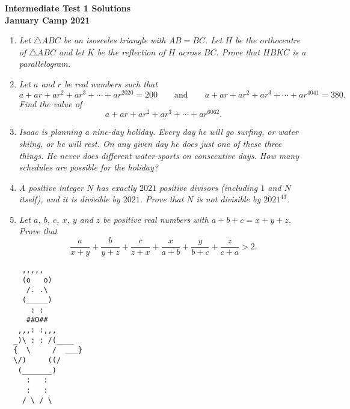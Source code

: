 \documentclass{article}
\begin{document}
\thispagestyle{empty}

\begin{center}
  \textbf{\Large Intermediate Test 1 Solutions}
  \\ \vspace{1em}
  \textbf{\large January Camp 2021}
\end{center}

\vspace{24pt}

\begin{enumerate}[1.]

  \item %
  {\itshape Let $\triangle ABC$ be an isosceles triangle with $AB = BC$. Let $H$ be the orthocentre of $\triangle ABC$ and let $K$ be the reflection of $H$ across $BC$. Prove that $HBKC$ is a parallelogram.}
  
  
  \item %
  {\itshape Let $a$ and $r$ be real numbers such that
  \[ a +ar +ar^2 +ar^3 +\dotsb +ar^{2020} = 200 \qquad\text{and}\qquad a +ar +ar^2 +ar^3 +\dotsb +ar^{4041} = 380. \]
  Find the value of
  \[ a +ar +ar^2 +ar^3 +\dotsb +ar^{6062}. \]}
  
  
  \item %
  {\itshape Isaac is planning a nine-day holiday. Every day he will go surfing, or water skiing, or he will rest. On any given day he does just one of these three things. He never does different water-sports on consecutive days. How many schedules are possible for the holiday?}
  
  \item %
  {\itshape A positive integer $N$ has exactly $2021$ positive divisors (including $1$ and $N$ itself), and it is divisible by $2021$.
  Prove that $N$ is not divisible by $2021^{43}$.}
  
  
  \item %
  {\itshape Let $a$, $b$, $c$, $x$, $y$ and $z$ be positive real numbers with $a + b + c = x + y + z$.
  Prove that 
  \[ \frac{a}{x + y} + \frac{b}{y + z} + \frac{c}{z + x} + \frac{x}{a + b} + \frac{y}{b + c} + \frac{z}{c + a} > 2. \]}
  
  
  \end{enumerate}
  
  \vfill
  \centering
  \begin{BVerbatim}
    ,,,,,
    (o   o)
     /. .\ 
    (_____)
      : :
     ##O##
   ,,,: :,,,
  _)\ : : /(____
  {  \     /  ___}
  \/)     ((/
   (_______)
     :   :
     :   :
    / \ / \
  \end{BVerbatim}
  
\end{document}

